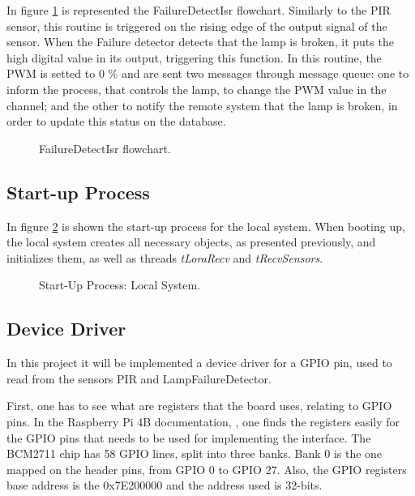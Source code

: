 In figure \ref{fig:fail_isr} is represented the FailureDetectIsr flowchart. Similarly to the PIR sensor, this routine is triggered on the rising edge of the output signal of the sensor. When the Failure detector detects that the lamp is broken, it puts the high digital value in its output, triggering this function. In this routine, the PWM is setted to 0 \% and are sent two messages through message queue: one to inform the process, that controls the lamp, to change the PWM value in the channel; and the other to notify the remote system that the lamp is broken, in order to update this status on the database.

\begin{figure}[H]
	\centering
	\caption{FailureDetectIsr flowchart.}
	\label{fig:fail_isr}
\end{figure}

\subsection{Start-up Process}
In figure \ref{fig:bootLS} is shown the start-up process for the local system. When booting up, the local system creates all necessary objects, as presented previously, and initializes them, as well as threads \textit{tLoraRecv} and \textit{tRecvSensors}.

\begin{figure}[H]
	\centering
	\caption{Start-Up Process: Local System.}
	\label{fig:bootLS}
\end{figure}


\clearpage
\subsection{Device Driver}
In this project it will be implemented a device driver for a GPIO pin, used to read from the sensors PIR and LampFailureDetector.

First, one has to see what are registers that the board uses, relating to GPIO pins. In the Raspberry Pi 4B documentation, \cite{rpi_datasheet}, one finds the registers easily for the GPIO pins that needs to be used for implementing the interface. The BCM2711 chip has 58 GPIO lines, split into three banks. Bank 0 is the one mapped on the header pins, from GPIO 0 to GPIO 27. Also, the GPIO registers base address is the 0x7E200000 and the address used is 32-bits.

